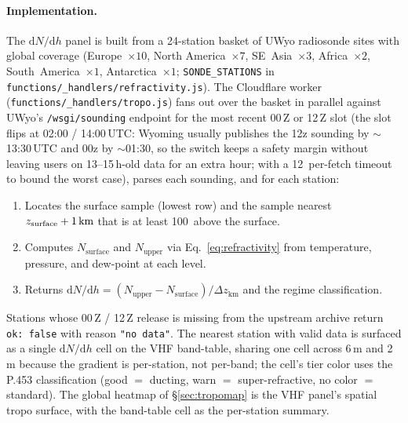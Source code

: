 \documentclass[11pt,a4paper]{article}
\newcommand{\SI}[2]{#1\,\text{#2}}
\newcommand{\km}{\text{km}}
\begin{document}
\paragraph{Implementation.} The $\mathrm{d}N/\mathrm{d}h$ panel is
built from a 24-station basket of UWyo radiosonde sites with global
coverage (Europe~$\times 10$, North America~$\times 7$,
SE~Asia~$\times 3$, Africa~$\times 2$, South~America~$\times 1$,
Antarctica~$\times 1$; \texttt{SONDE\_STATIONS} in
\texttt{functions/\_handlers/refractivity.js}).
The Cloudflare worker (\texttt{functions/\_handlers/tropo.js}) fans
out over the basket in parallel against UWyo's
\texttt{/wsgi/sounding} endpoint for the most recent 00\,Z or 12\,Z
slot (the slot flips at 02:00 / 14:00\,UTC: Wyoming usually
publishes the 12z sounding by ${\sim}$13:30\,UTC and 00z by
${\sim}$01:30, so the switch keeps a safety margin without leaving
users on 13--15\,h-old data for an extra hour; with a \SI{12}{s}
per-fetch timeout to bound the worst case),
parses each sounding, and for each station:
\begin{enumerate}[nosep]
  \item Locates the surface sample (lowest row) and the sample
        nearest $z_{\text{surface}} + \SI{1}{\km}$ that is at least
        \SI{100}{m} above the surface.
  \item Computes $N_{\text{surface}}$ and $N_{\text{upper}}$ via
        Eq.~\ref{eq:refractivity} from temperature, pressure, and
        dew-point at each level.
  \item Returns $\mathrm{d}N/\mathrm{d}h = (N_{\text{upper}} -
        N_{\text{surface}})/\Delta z_{\text{km}}$ and the regime
        classification.
\end{enumerate}
Stations whose 00\,Z / 12\,Z release is missing from the upstream
archive return \texttt{ok: false} with reason
\texttt{"no data"}.  The nearest station with valid data is
surfaced as a
single $\mathrm{d}N/\mathrm{d}h$ cell on the VHF band-table,
sharing one cell across 6\,m and 2\,m because the gradient is
per-station, not per-band; the cell's tier color uses the P.453
classification (good $=$ ducting, warn $=$ super-refractive, no
color $=$ standard).  The global
heatmap of \S\ref{sec:tropomap} is the VHF panel's spatial tropo
surface, with the band-table cell as the per-station summary.
\end{document}
